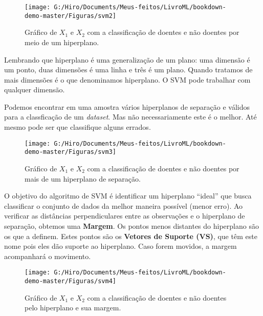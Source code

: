 \documentclass[
  openany]{book}
\begin{document}
\begin{figure}

{\centering \texttt{[image: G:/Hiro/Documents/Meus-feitos/LivroML/bookdown-demo-master/Figuras/svm2]} 

}

\caption{Gráfico de \(X_1\) e \(X_2\) com a classificação de doentes e não doentes por meio de um hiperplano.}\label{fig:svm2}
\end{figure}



Lembrando que hiperplano é uma generalização de um plano: uma dimensão é um ponto, duas dimensões é uma linha e três é um plano. Quando tratamos de mais dimensões é o que denominamos hiperplano. O SVM pode trabalhar com qualquer dimensão.

Podemos encontrar em uma amostra vários hiperplanos de separação e válidos para a classficação de um \emph{dataset}. Mas não necessariamente este é o melhor. Até mesmo pode ser que classifique alguns errados.

\begin{figure}

{\centering \texttt{[image: G:/Hiro/Documents/Meus-feitos/LivroML/bookdown-demo-master/Figuras/svm3]} 

}

\caption{Gráfico de \(X_1\) e \(X_2\) com a classificação de doentes e não doentes por mais de um hiperplano de separação.}\label{fig:svm3}
\end{figure}



O objetivo do algoritmo de SVM é identificar um hiperplano ``ideal'' que busca classificar o conjunto de dados da melhor maneira possível (menor erro). Ao verificar as distâncias perpendiculares entre as observações e o hiperplano de separação, obtemos uma \textbf{Margem}. Os pontos menos distantes do hiperplano são os que a definem. Estes pontos são os \textbf{Vetores de Suporte (VS)}, que têm este nome pois eles dão suporte ao hiperplano. Caso forem movidos, a margem acompanhará o movimento.

\begin{figure}

{\centering \texttt{[image: G:/Hiro/Documents/Meus-feitos/LivroML/bookdown-demo-master/Figuras/svm4]} 

}

\caption{Gráfico de \(X_1\) e \(X_2\) com a classificação de doentes e não doentes pelo hiperplano e sua margem.}\label{fig:svm4}
\end{figure}
\end{document}
